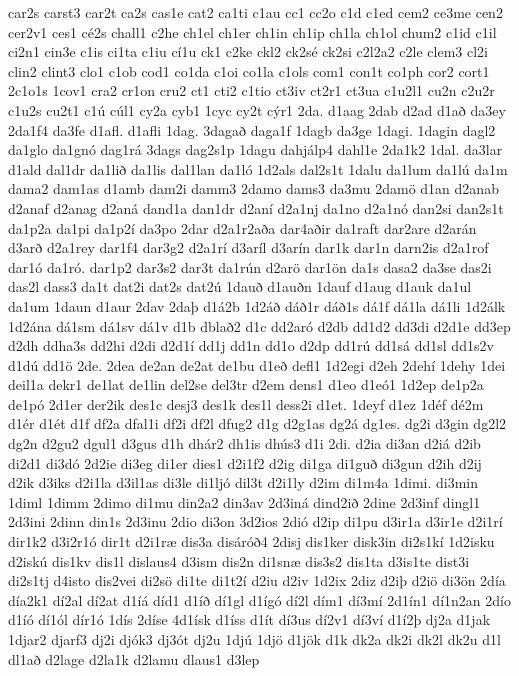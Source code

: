 {car2s
carst3
car2t
ca2s
cas1e
cat2
ca1ti
c1au
cc1
cc2o
c1d
c1ed
cem2
ce3me
cen2
cer2v1
ces1
cé2s
chall1
c2he
ch1el
ch1er
ch1in
ch1ip
ch1la
ch1ol
chum2
c1id
c1il
ci2n1
cin3e
c1is
ci1ta
c1iu
cí1u
ck1
c2ke
ckl2
ck2sé
ck2si
c2l2a2
c2le
clem3
cl2i
clin2
clint3
clo1
c1ob
cod1
co1da
c1oi
co1la
c1ols
com1
con1t
co1ph
cor2
cort1
2c1o1s
1cov1
cra2
cr1on
cru2
ct1
cti2
c1tio
ct3iv
ct2r1
ct3ua
c1u2l1
cu2n
c2u2r
c1u2s
cu2t1
c1ú
cúl1
cy2a
cyb1
1cyc
cy2t
cýr1
2da.
d1aag
2dab
d2ad
d1að
da3ey
2da1f4
da3fe
d1afl.
d1afli
1dag.
3dagað
daga1f
1dagb
da3ge
1dagi.
1dagin
dagl2
da1glo
da1gnó
dag1rá
3dags
dag2s1p
1dagu
dahjálp4
dahl1e
2da1k2
1dal.
da3lar
d1ald
dal1dr
da1lið
da1lis
dal1lan
da1ló
1d2als
dal2s1t
1dalu
da1lum
da1lú
da1m
dama2
dam1as
d1amb
dam2i
damm3
2damo
dams3
da3mu
2damö
d1an
d2anab
d2anaf
d2anag
d2aná
dand1a
dan1dr
d2aní
d2a1nj
da1no
d2a1nó
dan2si
dan2s1t
da1p2a
da1pi
da1p2í
da3po
2dar
d2a1r2aða
dar4aðir
da1raft
dar2are
d2arán
d3arð
d2a1rey
dar1f4
dar3g2
d2a1rí
d3aríl
d3arín
dar1k
dar1n
darn2is
d2a1rof
dar1ó
da1ró.
dar1p2
dar3s2
dar3t
da1rún
d2arö
dar1ön
da1s
dasa2
da3se
das2i
das2l
dass3
da1t
dat2i
dat2s
dat2ú
1dauð
d1auðn
1dauf
d1aug
d1auk
da1ul
da1um
1daun
d1aur
2dav
2daþ
d1á2b
1d2áð
dáð1r
dáð1s
dá1f
dá1la
dá1li
1d2álk
1d2ána
dá1sm
dá1sv
dá1v
d1b
dblað2
d1c
dd2aró
d2db
dd1d2
dd3di
d2d1e
dd3ep
d2dh
ddha3s
dd2hi
d2di
d2d1í
dd1j
dd1n
dd1o
d2dp
dd1rú
dd1sá
dd1sl
dd1s2v
d1dú
dd1ö
2de.
2dea
de2an
de2at
de1bu
d1eð
defl1
1d2egi
d2eh
2dehí
1dehy
1dei
deil1a
dekr1
de1lat
de1lin
del2se
del3tr
d2em
dens1
d1eo
d1eó1
1d2ep
de1p2a
de1pó
2d1er
der2ik
des1c
desj3
des1k
des1l
dess2i
d1et.
1deyf
d1ez
1déf
dé2m
d1ér
d1ét
d1f
df2a
dfal1i
df2i
df2l
dfug2
d1g
d2g1as
dg2á
dg1es.
dg2i
d3gin
dg2l2
dg2n
d2gu2
dgul1
d3gus
d1h
dhár2
dh1is
dhús3
d1i
2di.
d2ia
di3an
d2iá
d2ib
di2d1
di3dó
2d2ie
di3eg
di1er
dies1
d2i1f2
d2ig
di1ga
di1guð
di3gun
d2ih
d2ij
d2ik
d3iks
d2i1la
d3il1as
di3le
di1ljó
dil3t
d2i1ly
d2im
di1m4a
1dimi.
di3min
1diml
1dimm
2dimo
di1mu
din2a2
din3av
2d3iná
dind2ið
2dine
2d3inf
dingl1
2d3ini
2dinn
din1s
2d3inu
2dio
di3on
3d2ios
2dió
d2ip
di1pu
d3ir1a
d3ir1e
d2i1rí
dir1k2
d3i2r1ó
dir1t
d2i1ræ
dis3a
disáróð4
2disj
dis1ker
disk3in
di2s1kí
1d2isku
d2iskú
dis1kv
dis1l
dislaus4
d3ism
dis2n
di1snæ
dis3s2
dis1ta
d3is1te
dist3i
di2s1tj
d4isto
dis2vei
di2sö
di1te
di1t2í
d2iu
d2iv
1d2ix
2diz
d2iþ
d2iö
di3ön
2día
día2k1
dí2al
dí2at
d1íá
díd1
d1íð
dí1gl
d1ígó
dí2l
dím1
dí3mí
2d1ín1
dí1n2an
2dío
d1íó
dí1ól
dír1ó
1dís
2díse
4d1ísk
d1íss
d1ít
dí3us
dí2v1
dí3ví
d1í2þ
dj2a
d1jak
1djar2
djarf3
dj2i
djók3
dj3ót
dj2u
1djú
1djö
d1jök
d1k
dk2a
dk2i
dk2l
dk2u
d1l
dl1að
d2lage
d2la1k
d2lamu
dlaus1
d3lep
}
